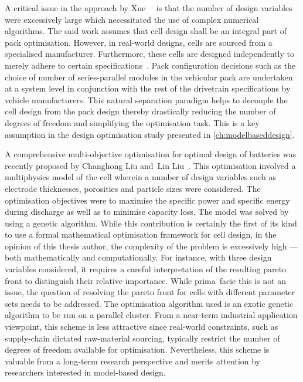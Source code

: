 
A critical issue in the approach  by Xue~\etal~\cite{Xue2014} is that the number
of design variables were excessively large which necessitated the use of complex
numerical  algorithms. The  said  work  assumes that  cell  design  shall be  an
integral part  of pack optimisation.  However, in real-world designs,  cells are
sourced from a  specialised manufacturer. Furthermore, these  cells are designed
independently to merely  adhere to certain specifications~\cite{Maksimovic2012}.
Pack configuration  decisions such  as the choice  of number  of series-parallel
modules in  the vehicular pack are  undertaken at a system  level in conjunction
with the  rest of the  drivetrain specifications by vehicle  manufacturers. This
natural separation  paradigm helps  to decouple  the cell  design from  the pack
design  thereby  drastically reducing  the  number  of  degrees of  freedom  and
simplifying  the optimisation  task.  This is  a key  assumption  in the  design
optimisation study presented in \cref{ch:modelbaseddesign}.

A  comprehensive multi-objective  optimisation for  optimal design  of batteries
was  recently  proposed  by  Changhong  Liu  and~Lin  Liu~\cite{Liu2017b}.  This
optimisation  involved a  multiphysics model  of the  cell wherein  a number  of
design variables  such as electrode  thicknesses, porosities and  particle sizes
were considered. The optimisation objectives were to maximise the specific power
and specific energy  during discharge as well as to  minimise capacity loss. The
model  was solved  by  using a  genetic algorithm.  While  this contribution  is
certainly  the first  of  its kind  to use  a  formal mathematical  optimisation
framework for cell design, in the  opinion of this thesis author, the complexity
of the problem is excessively  high --- both mathematically and computationally.
For  instance, with  three design  variables considered,  it requires  a careful
interpretation  of the  resulting  pareto front  to  distinguish their  relative
importance. While  prima~facie this is not  an issue, the question  of resolving
the pareto front for cells with  different parameter sets needs to be addressed.
The optimisation algorithm  used is an exotic  genetic algorithm to be  run on a
parallel cluster. From a near-term industrial application viewpoint, this scheme
is less attractive  since real-world constraints, such  as supply-chain dictated
raw-material  sourcing, typically  restrict  the number  of  degrees of  freedom
available  for  optimisation.  Nevertheless,  this scheme  is  valuable  from  a
long-term research perspective and merits attention by researchers interested in
model-based design.

